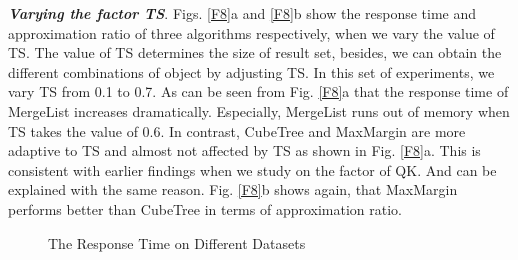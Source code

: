 \textbf{\textit{Varying the factor TS}}. Figs. \ref{F8}a and \ref{F8}b show the response time and approximation ratio of three algorithms respectively, when we vary the value of TS. The value of TS determines the size of result set, besides, we can obtain the different combinations of object by adjusting TS. In this set of experiments, we vary TS from 0.1 to 0.7. As can be seen from Fig. \ref{F8}a that the response time of MergeList increases dramatically. Especially, MergeList runs out of memory when TS takes the value of 0.6. In contrast, CubeTree and MaxMargin are more adaptive to TS and almost not affected by TS as shown in Fig. \ref{F8}a. This is consistent with earlier findings when we study on the factor of QK. And can be explained with the same reason. Fig. \ref{F8}b shows again, that MaxMargin performs better than CubeTree in terms of approximation ratio.


\begin{figure}[h] \centering
\caption{The Response Time on Different Datasets}
\label{F11}
\end{figure}

